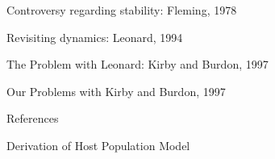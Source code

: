\documentclass[presentation]{beamer}
\begin{document}
\begin{frame}[label=sec-5]{Controversy regarding stability: Fleming, 1978}
\end{frame}
\begin{frame}[label=sec-6]{Revisiting dynamics: Leonard, 1994}
\end{frame}
\begin{frame}[label=sec-7]{The Problem with Leonard: Kirby and Burdon, 1997}
\end{frame}
\begin{frame}[label=sec-8]{Our Problems with Kirby and Burdon, 1997}
\end{frame}
\begin{frame}{References}


\end{frame}
\appendix
\begin{frame}[label=HostDerivation]{Derivation of Host Population Model}
\hyperlink{PathogenDerivation}{}
\end{frame}
\end{document}
